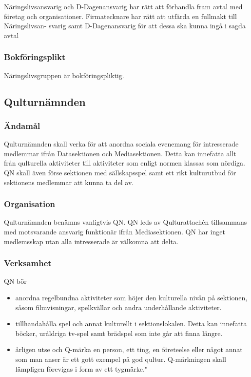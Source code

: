 \documentclass{dgovdoc}
\begin{document}
Näringslivsansvarig och D-Dagenansvarig har rätt att förhandla fram avtal med företag
och organisationer. Firmatecknare har rätt att utfärda en fullmakt till Näringslivsan-
svarig samt D-Dagenansvarig för att dessa ska kunna ingå i sagda avtal

\subsubsection{Bokföringsplikt}
Näringslivsgruppen är bokföringspliktig.

\subsection{Qulturnämnden}

\subsubsection{Ändamål}

Qulturnämnden skall verka för att anordna sociala evenemang för intresserade medlemmar ifrån Datasektionen och Mediasektionen. Detta kan innefatta allt från qulturella aktiviteter till aktiviteter som enligt normen klassas som nördiga. QN skall även förse sektionen med sällskapsspel samt ett rikt kulturutbud för sektionens medlemmar att kunna ta del av.

\subsubsection{Organisation}

Qulturnämnden benämns vanligtvis QN. QN leds av Qulturattachén tillsammans med motsvarande ansvarig funktionär ifrån Mediasektionen. QN har inget medlemsskap utan alla intresserade är välkomna att delta.

\subsubsection{Verksamhet}

QN bör
\begin{itemize}
  \item anordna regelbundna aktiviteter som höjer den kulturella nivån på sektionen, såsom filmvisningar, spelkvällar och andra underhållande aktiviteter.
  \item tillhandahålla spel och annat kulturellt i sektionslokalen. Detta kan innefatta böcker, uråldriga tv-spel samt brädspel som inte går att finna längre.
  \item årligen utse och Q-märka en person, ett ting, en företeelse eller något annat som man anser är ett gott exempel på god qultur. Q-märkningen skall lämpligen förevigas i form av ett tygmärke."
\end{itemize}
\end{document}
